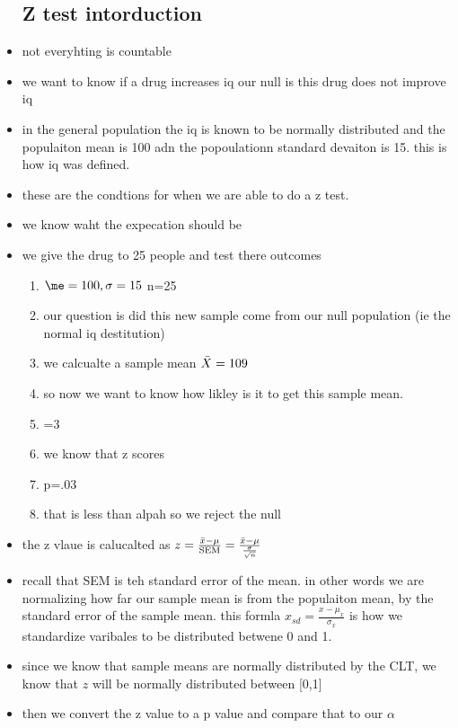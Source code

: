\documentclass{article}
\begin{document}
\begin{itemize}
\subsection{Z test intorduction}
\item not everyhting is countable 
\item we want to know if a drug increases iq 
\itme our null is this drug does not improve iq 
\item in the general population the iq is known to be normally distributed and the populaiton mean is 100 adn the popoulationn standard devaiton is 15. this is how iq was defined. 
\item these are the condtions for when we are able to do a z test. 
\item we know waht the expecation should be 
\item we give the drug to 25 people and test there outcomes 
\begin{enumerate}
    \item $\me=100, \sigma=15$ n=25
    \item our question is did this new sample come from our null population (ie the normal iq destitution) 
    \item we calcualte a sample mean $\Bar{X}=109$
    \item so now we want to know how likley is it to get this sample mean. 
    \item {}=3
    \item we know that z scores 
    \item p=.03
    \item that is less than alpah so we reject the null
\end{enumerate}
\item the z vlaue is calucalted as $z=\frac{\Bar{x}-\mu}{\text{SEM}}=\frac{\Bar{x}-\mu}{\frac{\sigma}{\sqrt{n}}}$
\item recall that SEM is teh standard error of the mean. in other words we are normalizing how far our sample mean is from the populaiton mean, by the standard error of the sample mean. this formla $x_{sd}=\frac{x-\mu_x}{\sigma_x}$ is how we standardize varibales to be distributed betwene 0 and 1.
\item since  we know that sample means are normally distributed by the CLT, we know that $z$ will be normally distributed between [0,1]
\item then we convert the z value to a p value and compare that to our $\alpha$

\end{itemize}
\end{document}
